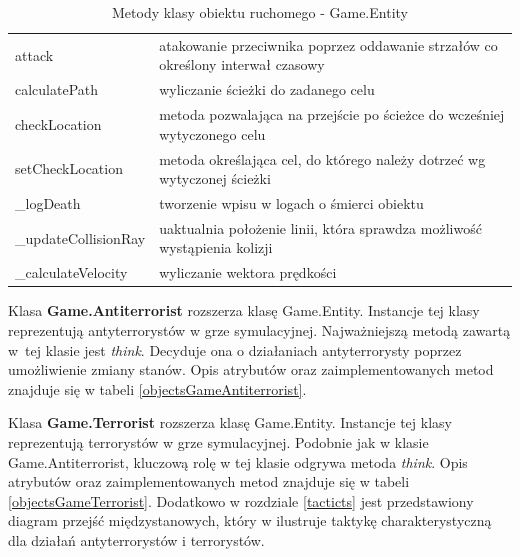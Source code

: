 \begin{table}
\begin{center}
\begin{tabular}{|p{}|p{}|}
	attack & atakowanie przeciwnika poprzez oddawanie strzałów co określony interwał czasowy\\
	calculatePath & wyliczanie ścieżki do zadanego celu\\
	checkLocation & metoda pozwalająca na przejście po ścieżce do wcześniej wytyczonego celu\\
	setCheckLocation & metoda określająca cel, do którego należy dotrzeć wg wytyczonej ścieżki\\
	\_logDeath & tworzenie wpisu w logach o śmierci obiektu\\
	\_updateCollisionRay & uaktualnia położenie linii, która sprawdza możliwość wystąpienia kolizji\\
	\_calculateVelocity & wyliczanie wektora prędkości
\\\hline
\end{tabular}
\caption {Metody klasy obiektu ruchomego - Game.Entity\label{objectsGameEntityFuncs}}
\end{center}
\end{table} 

Klasa \textbf{Game.Antiterrorist} rozszerza klasę Game.Entity. Instancje tej klasy reprezentują antyterrorystów w grze symulacyjnej. Najważniejszą metodą zawartą w~tej klasie jest \emph{think}. Decyduje ona o działaniach antyterrorysty poprzez umożliwienie zmiany stanów. Opis atrybutów oraz zaimplementowanych metod znajduje się w tabeli \ref{objectsGameAntiterrorist}.

Klasa \textbf{Game.Terrorist} rozszerza klasę Game.Entity. Instancje tej klasy reprezentują terrorystów w grze symulacyjnej. Podobnie jak w klasie Game.Antiterrorist, kluczową rolę w tej klasie odgrywa metoda \emph{think}. Opis atrybutów oraz zaimplementowanych metod znajduje się w tabeli \ref{objectsGameTerrorist}. Dodatkowo w rozdziale \ref{tacticts} jest przedstawiony diagram przejść międzystanowych, który w ilustruje taktykę charakterystyczną dla działań antyterrorystów i terrorystów. 

